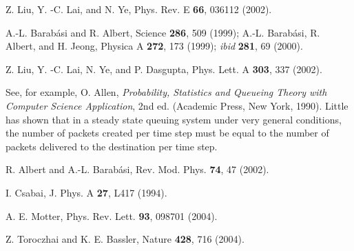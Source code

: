\documentclass[aps,prl,twocolumn,superscriptaddress,showpacs]{revtex4}
\begin{document}
\begin{references}
Z. Liu, Y. -C. Lai, and N. Ye, Phys. Rev. E {\bf 66}, 036112 (2002).

A.-L. Barab\'{a}si and R. Albert, Science {\bf 286}, 509 (1999);
A.-L. Barab\'{a}si, R. Albert, and H. Jeong, Physica A {\bf 272}, 173 (1999);
{\it ibid} {\bf 281}, 69 (2000).

Z. Liu, Y. -C. Lai, N. Ye, and P. Dasgupta, Phys. Lett. A {\bf 303},
337 (2002).

 See, for example, O. Allen, {\it
Probability, Statistics and Queueing Theory with Computer Science
Application}, 2nd ed. (Academic Press, New York, 1990). Little has
shown that in a steady state queuing system under very general
conditions, the number of packets created per time step must be
equal to the number of packets delivered to the destination per
time step.

R. Albert and A.-L. Barab\'{a}si, Rev. Mod. Phys. {\bf 74}, 47
(2002).

I. Csabai, J. Phys. A {\bf 27}, L417 (1994).

A. E. Motter, Phys. Rev. Lett. {\bf 93}, 098701 (2004).

Z. Toroczhai and K. E. Bassler, Nature {\bf 428}, 716 (2004).

\end{references}
\end{document}
